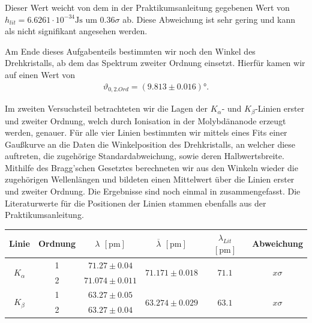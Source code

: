 Dieser Wert weicht von dem in der Praktikumsanleitung gegebenen Wert von $h_{lit} = 6.6261 \cdot 10^{-34} \si{\joule\second}$ um $0.36\sigma$ ab. Diese Abweichung ist sehr gering und kann als nicht signifikant angesehen werden.

Am Ende dieses Aufgabenteils bestimmten wir noch den Winkel des Drehkristalls, ab dem das Spektrum zweiter Ordnung einsetzt. Hierfür kamen wir auf einen Wert von
\begin{align}
  \vartheta_{0,2. Ord} = (9.813 \pm 0.016)\si{\degree}.
\end{align}

Im zweiten Versuchsteil betrachteten wir die Lagen der $K_{\alpha}$- und $K_{\beta}$-Linien erster und zweiter Ordnung, welch durch Ionisation in der Molybdänanode erzeugt werden, genauer. Für alle vier Linien bestimmten wir mittels eines Fits einer Gaußkurve an die Daten die Winkelposition des Drehkristalls, an welcher diese auftreten, die zugehörige Standardabweichung, sowie deren Halbwertsbreite. Mithilfe des Bragg'schen Gesetztes berechneten wir aus den Winkeln wieder die zugehörigen Wellenlängen und bildeten einen Mittelwert über die Linien erster und zweiter Ordnung. Die Ergebnisse sind noch einmal in  zusammengefasst. Die Literaturwerte für die Positionen der Linien stammen ebenfalls aus der Praktikumsanleitung.

\begin{table}[H]
  \centering
  \begin{tabular}{c|c|c|c|c|c}
    Linie & Ordnung & $\lambda$ $[\si{\pico\meter}]$ & $\overline{\lambda}$ $[\si{\pico\meter}]$ & $\lambda_{Lit}$ $[\si{\pico\meter}]$ & Abweichung\\\hline
    \multirow{2}{*}{$K_\alpha$} & 1 & $71.27 \pm 0.04$ & \multirow{2}{*}{$71.171 \pm 0.018$} & \multirow{2}{*}{$71.1$} & \multirow{2}{*}{$x\sigma$}\\
     & 2 & $71.074 \pm 0.011$ & & & \\\hline
    \multirow{2}{*}{$K_\beta$} & 1 & $63.27 \pm 0.05$ & \multirow{2}{*}{$63.274 \pm 0.029$} & \multirow{2}{*}{$63.1$} & \multirow{2}{*}{$x\sigma$}\\
     & 2 & $63.27 \pm 0.04$ & & & 
  \end{tabular}
  \label{tab:k_linien_zsmf}
\end{table}
